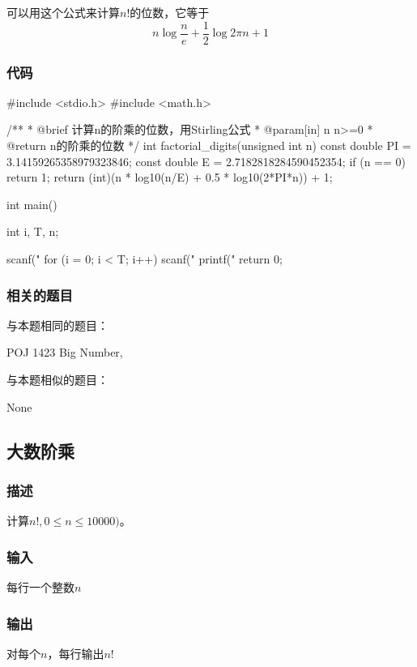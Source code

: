 可以用这个公式来计算$n!$的位数，它等于
$$
n\log{\dfrac{n}{e}}+\dfrac{1}{2}\log{2\pi n}+1
$$

\subsubsection{代码}
\begin{Codex}[label=bigint_factorial_digits.c]
#include <stdio.h>
#include <math.h>

/**
 * @brief 计算n的阶乘的位数，用Stirling公式
 * @param[in] n n>=0
 * @return n的阶乘的位数
 */
int factorial_digits(unsigned int n) {
    const double PI = 3.14159265358979323846;
    const double E = 2.7182818284590452354;
    if (n == 0) return 1;
    return (int)(n * log10(n/E) + 0.5 * log10(2*PI*n)) + 1;
}

int main() {
    int i, T, n;

    scanf("%
    for (i = 0; i < T; i++) {
        scanf("%
        printf("%
    }
    return 0;
}
\end{Codex}

\subsubsection{相关的题目}
与本题相同的题目：
\begindot
\item POJ 1423 Big Number, 
\myenddot

与本题相似的题目：
\begindot
\item  None
\myenddot


\subsection{大数阶乘} %
\subsubsection{描述}
计算$n!, 0 \leq n \leq 10000)$。

\subsubsection{输入}
每行一个整数$n$

\subsubsection{输出}
对每个$n$，每行输出$n!$

